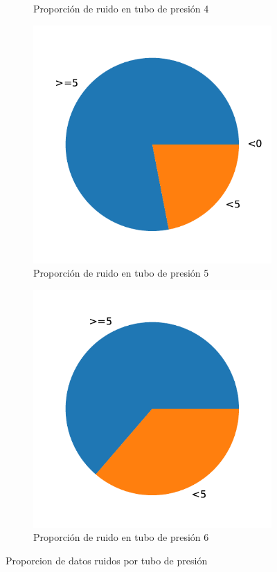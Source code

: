 \documentclass[a4paper,12pt,twoside,oldfontcommands]{memoir}
\begin{document}
\begin{figure}
\begin{subfigure}[b]{0.45\textwidth}
		\caption{Proporción de ruido en tubo de presión 4}
		\label{fig:p4_ruido}
	\end{subfigure}
	\begin{subfigure}[b]{0.45\textwidth}
		\includegraphics[width=\textwidth]{images/ruido/p5-ruido}
		\caption{Proporción de ruido en tubo de presión 5}
		\label{fig:p5_ruido}
	\end{subfigure}
	\begin{subfigure}[b]{0.45\textwidth}
		\includegraphics[width=\textwidth]{images/ruido/p6-ruido}
		\caption{Proporción de ruido en tubo de presión 6}
		\label{fig:p6_ruido}
	\end{subfigure}
	\caption{Proporcion de datos ruidos por tubo de presión}
	\label{fig:ruidos_tubos}
\end{figure}
\end{document}
